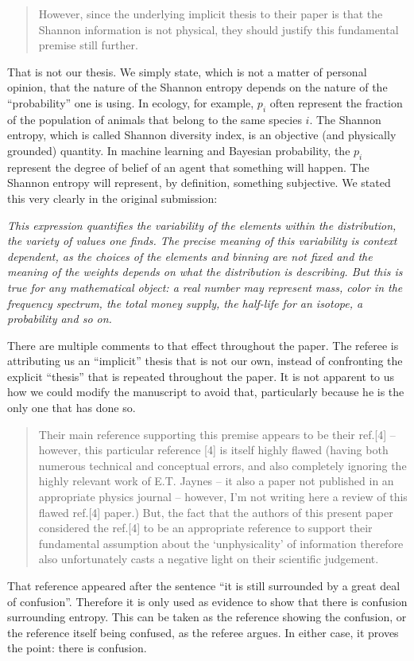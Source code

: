 \documentclass[11pt]{article}
\begin{document}
\begin{quote}
However, since the underlying implicit thesis to their paper is that the Shannon information is not physical, they should justify this fundamental premise still further.
\end{quote}
That is not our thesis. We simply state, which is not a matter of personal opinion, that the nature of the Shannon entropy depends on the nature of the ``probability'' one is using. In ecology, for example, $p_i$ often represent the fraction of the population of animals that belong to the same species $i$. The Shannon entropy, which is called Shannon diversity index, is an objective (and physically grounded) quantity. In machine learning and Bayesian probability, the $p_i$ represent the degree of belief of an agent that something will happen. The Shannon entropy will represent, by definition, something subjective. We stated this very clearly in the original submission:

\emph{This expression quantifies the variability of the elements within the distribution, the variety of values one finds. The precise meaning of this variability is context dependent, as the choices of the elements and binning are not fixed and the meaning of the weights depends on what the distribution is describing. But this is true for any mathematical object: a real number may represent mass, color in the frequency spectrum, the total money supply, the half-life for an isotope, a probability and so on.}

There are multiple comments to that effect throughout the paper. The referee is attributing us an ``implicit'' thesis that is not our own, instead of confronting the explicit ``thesis'' that is repeated throughout the paper.  It is not apparent to us how we could modify the manuscript to avoid that, particularly because he is the only one that has done so.

\begin{quote}
 Their main reference supporting this premise appears to be their ref.[4] – however, this particular reference [4] is itself highly flawed (having both numerous technical and conceptual errors, and also completely ignoring the highly relevant work of E.T. Jaynes – it also a paper not published in an appropriate physics journal – however, I’m not writing here a review of this flawed ref.[4] paper.) But, the fact that the authors of this present paper considered the ref.[4] to be an appropriate reference to support their fundamental assumption about the ‘unphysicality’ of information therefore also unfortunately casts a negative light on their scientific judgement.
\end{quote}
That reference appeared after the sentence ``it is still surrounded by a great deal of confusion''. Therefore it is only used as evidence to show that there is confusion surrounding entropy. This can be taken as the reference showing the confusion, or the reference itself being confused, as the referee argues. In either case, it proves the point: there is confusion.
\end{document}
